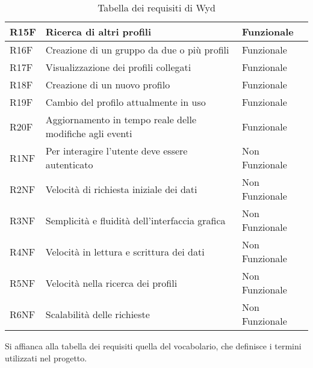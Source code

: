 \begin{table}
\begin{tabular} {|P{1.3cm}|P{11.2cm}|P{3cm}|}
        \hline
        R15F        & Ricerca di altri profili                                                    & Funzionale     \\
        \hline
        R16F        & Creazione di un gruppo da due o più profili                                 & Funzionale     \\
        \hline
        R17F        & Visualizzazione dei profili collegati                                       & Funzionale     \\
        \hline
        R18F        & Creazione di un nuovo profilo                                               & Funzionale     \\
        \hline
        R19F        & Cambio del profilo attualmente in uso                                       & Funzionale     \\
        \hline
        R20F        & Aggiornamento in tempo reale delle modifiche agli eventi                    & Funzionale     \\
        \hline
        R1NF        & Per interagire l’utente deve essere autenticato                             & Non Funzionale \\
        \hline
        R2NF        & Velocità di richiesta iniziale dei dati                                     & Non Funzionale \\
        \hline
        R3NF        & Semplicità e fluidità dell'interfaccia grafica                              & Non Funzionale \\
        \hline
        R4NF        & Velocità in lettura e scrittura dei dati                                    & Non Funzionale \\
        \hline
        R5NF        & Velocità nella ricerca dei profili                                          & Non Funzionale \\
        \hline
        R6NF        & Scalabilità delle richieste                                                 & Non Funzionale \\
        \hline
    \end{tabular}
    \caption{Tabella dei requisiti di Wyd}
\end{table}
\clearpage

Si affianca alla tabella dei requisiti quella del vocabolario, che definisce i termini utilizzati nel progetto.\\

